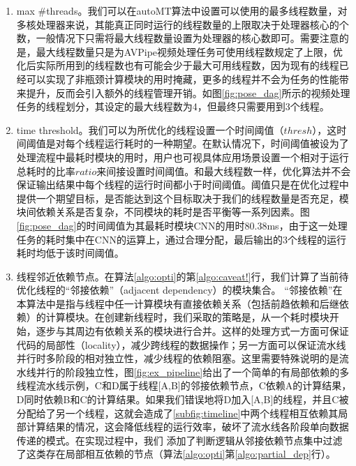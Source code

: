 \begin{enumerate}[wide]
    \item max \#threads。我们可以在autoMT算法中设置可以使用的最多线程数量，对多核处理器来说，其能真正同时运行的线程数量的上限取决于处理器核心的个数，一般情况下只需将最大线程数量设置为处理器的核心数即可。需要注意的是，最大线程数量只是为AVPipe视频处理任务可使用线程数规定了上限，优化后实际所用到的线程数也有可能会少于最大可用线程数，因为现有的线程已经可以实现了非瓶颈计算模块的用时掩藏，更多的线程并不会为任务的性能带来提升，反而会引入额外的线程管理开销。如图\ref{fig:pose_dag}所示的视频处理任务的线程划分，其设定的最大线程数为4，但最终只需要用到3个线程。
    
    \item time threshold。我们可以为所优化的线程设置一个时间阈值（$thresh$），这时间阈值是对每个线程运行耗时的一种期望。在默认情况下，时间阈值被设为了处理流程中最耗时模块的用时，用户也可视具体应用场景设置一个相对于运行总耗时的比率$ratio$来间接设置时间阈值。和最大线程数一样，优化算法并不会保证输出结果中每个线程的运行时间都小于时间阈值。阈值只是在优化过程中提供一个期望目标，是否能达到这个目标取决于我们的线程数量是否充足，模块间依赖关系是否复杂，不同模块的耗时是否平衡等一系列因素。图\ref{fig:pose_dag}的时间阈值为其最耗时模块CNN的用时80.38ms，由于这一处理任务的耗时集中在CNN的运算上，通过合理分配，最后输出的3个线程的运行耗时均低于该时间阈值。
    
    \item 线程邻近依赖节点。在算法\ref{algo:opti}的第\ref{algo:caveat!}行，我们计算了当前待优化线程的“邻接依赖”（adjacent dependency）的模块集合。%
    “邻接依赖”在本算法中是指与线程中任一计算模块有直接依赖关系（包括前趋依赖和后继依赖）的计算模块。在创建新线程时，我们采取的策略是，从一个耗时模块开始，逐步与其周边有依赖关系的模块进行合并。这样的处理方式一方面可保证代码的局部性（locality），减少跨线程的数据操作；另一方面可以保证流水线并行时多阶段的相对独立性，减少线程的依赖阻塞。这里需要特殊说明的是流水线并行的阶段独立性，图\ref{fig:ex_pipeline}给出了一个简单的有局部依赖的多线程流水线示例，C和D属于线程[A,B]的邻接依赖节点，C依赖A的计算结果，D同时依赖B和C的计算结果。如果我们错误地将D加入[A,B]的线程，并且C被分配给了另一个线程，这就会造成了\ref{subfig:timeline}中两个线程相互依赖其局部计算结果的情况，这会降低线程的运行效率，破坏了流水线各阶段单向数据传递的模式。在实现过程中，我们
   添加了判断逻辑从邻接依赖节点集中过滤了这类存在局部相互依赖的节点（算法\ref{algo:opti}第\ref{algo:partial_dep}行）。
\end{enumerate}

